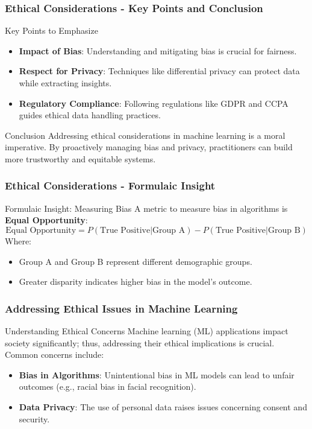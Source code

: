 \documentclass[aspectratio=169]{beamer}
\begin{document}
\begin{frame}[fragile]
    \frametitle{Ethical Considerations - Key Points and Conclusion}
    \begin{block}{Key Points to Emphasize}
        \begin{itemize}
            \item \textbf{Impact of Bias}: Understanding and mitigating bias is crucial for fairness.
            \item \textbf{Respect for Privacy}: Techniques like differential privacy can protect data while extracting insights.
            \item \textbf{Regulatory Compliance}: Following regulations like GDPR and CCPA guides ethical data handling practices.
        \end{itemize}
    \end{block}
    
    \begin{block}{Conclusion}
        Addressing ethical considerations in machine learning is a moral imperative. By proactively managing bias and privacy, practitioners can build more trustworthy and equitable systems.
    \end{block}
\end{frame}

\begin{frame}[fragile]
    \frametitle{Ethical Considerations - Formulaic Insight}
    \begin{block}{Formulaic Insight: Measuring Bias}
        A metric to measure bias in algorithms is \textbf{Equal Opportunity}:
        \begin{equation}
            \text{Equal Opportunity} = P(\text{True Positive} | \text{Group A}) - P(\text{True Positive} | \text{Group B})
        \end{equation}
        Where:
        \begin{itemize}
            \item Group A and Group B represent different demographic groups.
            \item Greater disparity indicates higher bias in the model's outcome.
        \end{itemize}
    \end{block}
\end{frame}

\begin{frame}[fragile]
    \frametitle{Addressing Ethical Issues in Machine Learning}
    \begin{block}{Understanding Ethical Concerns}
        Machine learning (ML) applications impact society significantly; thus, addressing their ethical implications is crucial. Common concerns include:
    \end{block}
    \begin{itemize}
        \item \textbf{Bias in Algorithms}: Unintentional bias in ML models can lead to unfair outcomes (e.g., racial bias in facial recognition).
        \item \textbf{Data Privacy}: The use of personal data raises issues concerning consent and security.
    \end{itemize}
\end{frame}
\end{document}
